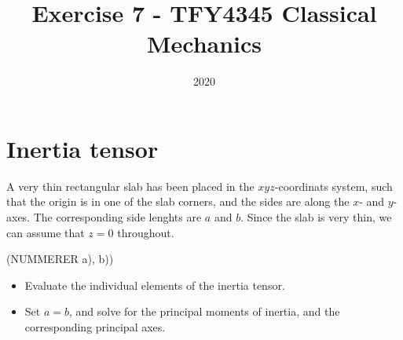 \documentclass{article}
\title{Exercise 7 - TFY4345 Classical Mechanics}
\date{2020}
\begin{document}
    \maketitle
    \section{Inertia tensor}
    A very thin rectangular slab has been placed in the $xyz$-coordinats system, such that the origin is in one of the slab corners, and the sides are along the $x$- and $y$-axes. The corresponding side lenghts are $a$ and $b$. Since the slab is very thin, we can assume that $z=0$ throughout.

    (NUMMERER a), b))
    \begin{itemize}
        \item Evaluate the individual elements of the inertia tensor.
        \item Set $a = b$, and solve for the principal moments of inertia, and the corresponding principal axes.
    \end{itemize}
\end{document}
